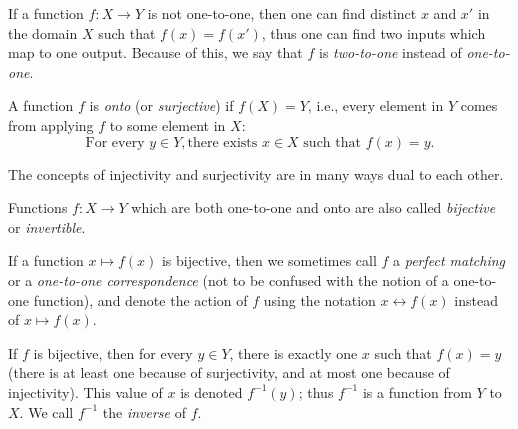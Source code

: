 \setcounter{theorem}{15}
\begin{remark}\label{3.3.16}
    If a function \(f : X \to Y\) is not one-to-one, then one can find distinct \(x\) and \(x'\) in the domain \(X\) such that \(f(x) = f(x')\), thus one can find two inputs which map to one output.
    Because of this, we say that \(f\) is \emph{two-to-one} instead of \emph{one-to-one}.
\end{remark}

\begin{definition}\label{3.3.17}
    A function \(f\) is \emph{onto} (or \emph{surjective}) if \(f(X) = Y\), i.e., every element in \(Y\) comes from applying \(f\) to some element in \(X\):
    \[
        \text{For every } y \in Y, \text{there exists } x \in X \text{ such that } f(x) = y.
    \]
\end{definition}

\setcounter{theorem}{18}
\begin{remark}\label{3.3.19}
    The concepts of injectivity and surjectivity are in many ways dual to each other.
\end{remark}

\begin{definition}\label{3.3.20}
    Functions \(f : X \to Y\) which are both one-to-one and onto are also called \emph{bijective} or \emph{invertible}.
\end{definition}

\setcounter{theorem}{22}
\begin{remark}\label{3.3.23}
    If a function \(x \mapsto f(x)\) is bijective, then we sometimes call \(f\) a \emph{perfect matching} or a \emph{one-to-one correspondence} (not to be confused with the notion of a one-to-one function), and denote the action of \(f\) using the notation \(x \leftrightarrow f(x)\) instead of \(x \mapsto f(x)\).
\end{remark}

\begin{note}
    If \(f\) is bijective, then for every \(y \in Y\), there is exactly one \(x\) such that \(f(x) = y\) (there is at least one because of surjectivity, and at most one because of injectivity).
    This value of \(x\) is denoted \(f^{-1}(y)\); thus \(f^{-1}\) is a function from \(Y\) to \(X\).
    We call \(f^{-1}\) the \emph{inverse} of \(f\).
\end{note}

\exercisesection

